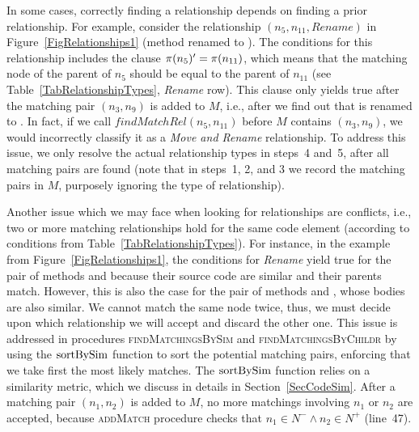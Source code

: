 In some cases, correctly finding a relationship depends on finding a prior relationship.
For example, consider the relationship $(n_5, n_{11}, Rename)$ in Figure~\ref{FigRelationships1} (method  renamed to ).
The conditions for this relationship includes the clause $\operatorname{\pi}(n_5)' = \operatorname{\pi}(n_{11})$, which means that the matching node of the parent of $n_5$ should be equal to the parent of $n_{11}$ (see Table~\ref{TabRelationshipTypes}, \textit{Rename} row).
This clause only yields true after the matching pair $(n_3, n_9)$ is added to $M$, i.e., after we find out that  is renamed to .
In fact, if we call $\mathit{findMatchRel}(n_5, n_{11})$ before $M$ contains $(n_3, n_9)$, we would incorrectly classify it as a \textit{Move and Rename} relationship.
To address this issue, we only resolve the actual relationship types in steps~4 and~5, after all matching pairs are found (note that in steps~1, 2, and 3 we record the matching pairs in $M$, purposely ignoring the type of relationship).

Another issue which we may face when looking for relationships are conflicts, i.e., two or more matching relationships hold for the same code element (according to conditions from Table~\ref{TabRelationshipTypes}).
For instance, in the example from Figure~\ref{FigRelationships1}, the conditions for \textit{Rename} yield true for the pair of methods  and  because their source code are similar and their parents match.
However, this is also the case for the pair of methods  and , whose bodies are also similar.
We cannot match the same node twice, thus, we must decide upon which relationship we will accept and discard the other one.
This issue is addressed in procedures \textsc{findMatchingsBySim} and \textsc{findMatchingsByChildr} by using the $\operatorname{sortBySim}$ function to sort the potential matching pairs, enforcing that we take first the most likely matches.
The $\operatorname{sortBySim}$ function relies on a similarity metric, which we discuss in details in Section~\ref{SecCodeSim}.
After a matching pair $(n_1, n_2)$ is added to $M$, no more matchings involving $n_1$ or $n_2$ are accepted, because \textsc{addMatch} procedure checks that $n_1 \in N^- \land n_2 \in N^+$ (line~47).







